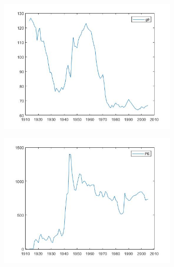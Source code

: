 \documentclass[12pt,a4paper]{article}
\begin{document}
\begin{figure}[h]
	\caption{General Fertility Rate (left) and Personal Exemption (right) }
	\centering
	\begin{subfigure}[b]{0.48\linewidth}
		\includegraphics[width=\linewidth]{gfr.jpg}
	\end{subfigure}
	\begin{subfigure}[b]{0.48\linewidth}
	\includegraphics[width=\linewidth]{PE.jpg}
\end{subfigure}
\end{figure}
\end{document}
